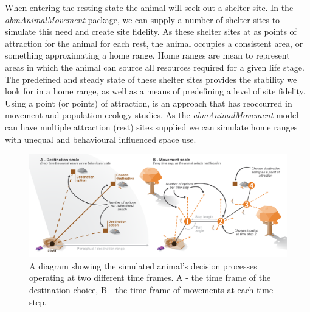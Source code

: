 \documentclass[10pt,a4paper]{article}
\begin{document}
When entering the resting state the animal will seek out a shelter site.
In the \emph{abmAnimalMovement} package, we can supply a number of shelter sites to simulate this need and create site fidelity.
As these shelter sites at as points of attraction for the animal for each rest, the animal occupies a consistent area, or something approximating a home range.
Home ranges are mean to represent areas in which the animal can source all resources required for a given life stage.
The predefined and steady state of these shelter sites provides the stability we look for in a home range, as well as a means of predefining a level of site fidelity.
Using a point (or points) of attraction, is an approach that has reoccurred in movement and population ecology studies.
As the \emph{abmAnimalMovement} model can have multiple attraction (rest) sites supplied we can simulate home ranges with unequal and behavioural influenced space use.

\begin{figure}

{\centering \includegraphics[width=0.8\linewidth]{../ext_figures/Simulation Process Diagram Static} 

}

\caption{A diagram showing the simulated animal's decision processes operating at two different time frames. A - the time frame of the destination choice, B - the time frame of movements at each time step.}\label{fig:walkDiagram}
\end{figure}
\end{document}
